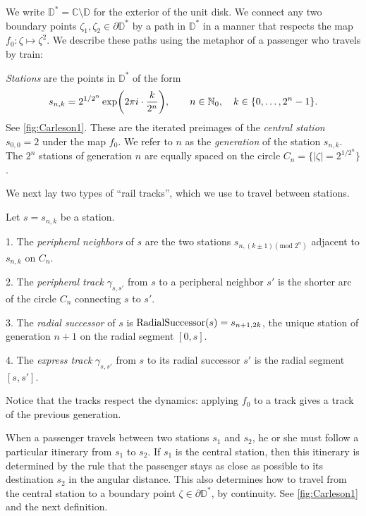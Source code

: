 We write $\mathbb D^* = \mathbb{C} \setminus \mathbb{D}$ for the exterior of the unit disk. We connect any two boundary points $\zeta_1, \zeta_2 \in \partial \mathbb D^*$ by a path in $\mathbb D^*$ in a manner that respects the map 
$f_0: \zeta \mapsto \zeta^2$.
We describe these paths using the metaphor of a passenger who travels by train:

\begin{definition}
\emph{Stations} are the points in $\mathbb D ^*$ of the form 
$$
s_{n,k}=2^{1/2^{n}} \exp \biggl (2\pi i \cdot \frac{k}{2^{n}} \biggr),\qquad n\in\mathbb{N}_{0},\quad k\in \{ 0,\ldots,2^{n}-1 \}.
$$ 
 See \cref{fig:Carleson1}. These are the iterated preimages of the \emph{central station} $s_{0,0} = 2$ under the map $f_{0}$.
We refer to $n$ as the \emph{generation} of the station $s_{n,k}$. 
The $2^{n}$ stations of generation $n$ are equally spaced on the circle $C_{n}=\bigl \{ |\zeta|=2^{1/2^{n}} \bigr \} $. 
\end{definition}

We next lay two types of \enquote{rail tracks}, which we use to travel between stations.

\begin{definition}
Let $s=s_{n,k}$ be a station.

1. The \emph{peripheral neighbors} of $s$ are the two stations $s_{n, (k\pm1) (\mathrm{mod}\; 2^{n})}$ adjacent to $s_{n,k}$ on $C_{n}$.

2. The \emph{peripheral track }$\gamma_{s,s'}$ from $s$ to a peripheral neighbor $s'$
is the shorter arc of the circle $C_{n}$ connecting $s$ to $s'$.

3. The \emph{radial successor} of $s$ is $\operatorname{RadialSuccessor}(s)=s_{n+1,2k}$, the unique station of generation $n+1$ on the radial segment $[0,s]$.

4. The \emph{express track} $\gamma_{s,s'}$ from $s$ to its radial successor $s'$ is the radial segment $[s,s']$.
\end{definition}
Notice that the tracks respect the dynamics: applying $f_0$ to a track gives a track of the previous generation.

When a passenger travels between two stations $s_1$ and $s_2$, he or she must follow a particular itinerary from $s_1$ to $s_2$.
If $s_1$ is the central station, then this itinerary is determined by the rule that the passenger stays as close as possible to its destination $s_2$ in the angular distance.
This also determines how to travel from the central station to a boundary point $\zeta\in \partial \mathbb D^*$, by continuity. 
See \cref{fig:Carleson1} and the next definition.


